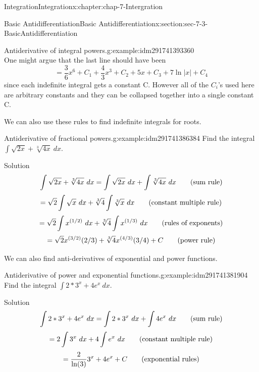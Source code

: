 \documentclass[oneside,10pt,]{book}
\numberwithin{equation}{section}
\begin{document}
\begin{chapterptx}{Integration}{}{Integration}{}{}{x:chapter:chap-7-Intergration}
\begin{sectionptx}{Basic Antidifferentiation}{}{Basic Antidifferentiation}{}{}{x:section:sec-7-3-BasicAntidifferentiation}
\begin{example}{Antiderivative of integral powers.}{g:example:idm291741393360}
\begin{equation*}
\end{equation*}
One might argue that the last line should have been%
%
\begin{equation*}
=\frac{3}{6} x^6+C_1+\frac{4}{3}x^3+C_2+5x+C_3+ 7\ln|x|+C_4
\end{equation*}
since each indefinite integral gets a constant C.  However all of the \(C_i\)’s used here are arbitrary constants and they can be collapsed together into a single constant C.%
\end{example}
We can also use these rules to find indefinite integrals for roots.%
\begin{example}{Antiderivative of fractional powers.}{g:example:idm291741386384}%
Find the integral \(\int \sqrt{2x}+\sqrt[3]{4x}\ dx\).%
\par
Solution%
%
\begin{equation*}
\int \sqrt{2x}+\sqrt[3]{4x}\ dx
=\int \sqrt{2x}\ dx+\int \sqrt[3]{4x}\ dx\qquad\hbox{(sum rule)}
\end{equation*}
%
\begin{equation*}
=\sqrt{2}\int \sqrt{x}\ dx+\sqrt[3]{4}\int \sqrt[3]{x}\ dx \qquad\hbox{(constant multiple rule)}
\end{equation*}
%
\begin{equation*}
=\sqrt{2}\int x^{(1/2)}\ dx+\sqrt[3]{4}\int x^{(1/3)}\ dx\qquad\hbox{(rules of exponents)}
\end{equation*}
%
\begin{equation*}
=\sqrt{2} x^{(3/2)}(2/3)+\sqrt[3]{4}x^{(4/3)}(3/4)+C\qquad\hbox{(power rule)}
\end{equation*}
\end{example}
We can also find anti-derivatives of exponential and power functions.%
\begin{example}{Antiderivative of power and exponential functions.}{g:example:idm291741381904}%
Find the integral \(\int 2*3^x+4e^x\ dx\).%
\par
Solution%
%
\begin{equation*}
\int 2*3^x+4e^x\ dx=\int 2*3^x\ dx+\int 4e^x\ dx\qquad\hbox{(sum rule)}
\end{equation*}
%
\begin{equation*}
=2\int 3^x\ dx+4\int e^x\ dx\qquad\hbox{(constant multiple rule)}
\end{equation*}
%
\begin{equation*}
=\frac{2}{\ln(3)} 3^x+4 e^x+C\qquad\hbox{(exponential rules)}
\end{equation*}
\end{example}

\end{sectionptx}
\end{chapterptx}
\end{document}
